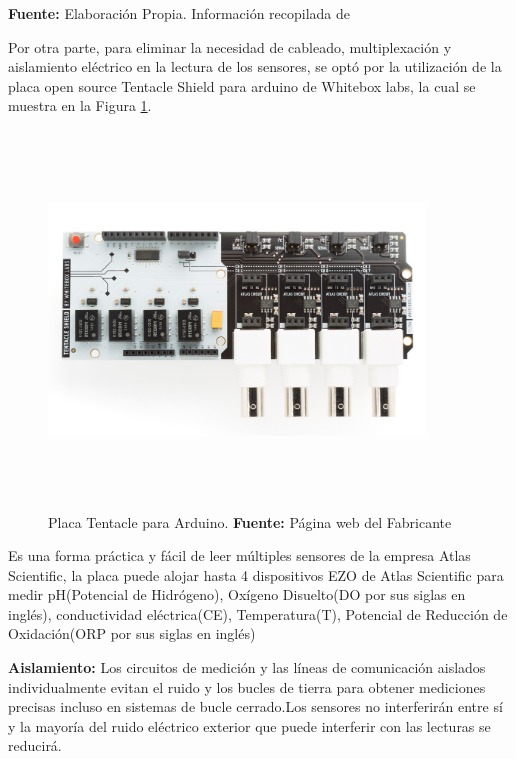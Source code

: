 \begin{itemize}
\begin{table}[t]
\begin{tabular}{|l|c|}
     \end{tabular}
     \vspace{5mm}
     \newline
     \hfill \textbf{Fuente:} Elaboración Propia. Información recopilada de \cite{rasp}
\end{table}
    Por otra parte, para eliminar la necesidad de cableado, multiplexación y aislamiento eléctrico en la lectura de los sensores, se optó por la utilización de la placa open source Tentacle Shield para arduino de Whitebox labs, la cual se muestra en la Figura \ref{fig:4.5}.
\begin{figure}[t]
    \centering
    \includegraphics[width=100mm, height=100mm]{Imagenes/2021/imag26.jpg}
    \caption[Placa Tentacle para Arduino]{Placa Tentacle para Arduino. \textbf{Fuente:} Página web del Fabricante}
    \label{fig:4.5}
\end{figure}

    Es una forma pr\'actica y fácil de leer múltiples sensores de la empresa Atlas Scientific, la placa puede alojar hasta 4 dispositivos EZO de Atlas Scientific para medir pH(Potencial de Hidrógeno), Oxígeno Disuelto(DO por sus siglas en inglés), conductividad eléctrica(CE), Temperatura(T), Potencial de Reducción de Oxidación(ORP por sus siglas en inglés)

    \textbf{Aislamiento:}
    Los circuitos de medición y las líneas de comunicación aislados individualmente evitan el ruido y los bucles de tierra para obtener mediciones precisas incluso en sistemas de bucle cerrado.Los sensores no interferirán entre sí y la mayoría del ruido eléctrico exterior que puede interferir con las lecturas se reducirá.


\end{itemize}
